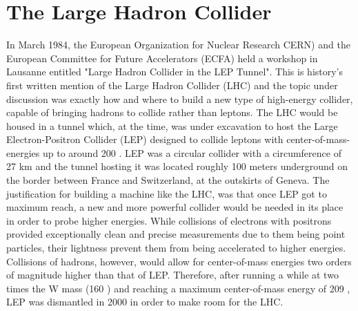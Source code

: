 \section{The Large Hadron Collider}
In March 1984, the European Organization for Nuclear Research CERN) and the European Committee for Future Accelerators (ECFA) 
held a workshop in Lausanne entitled "Large Hadron Collider in the LEP Tunnel". 
This is history's first written mention of the Large Hadron Collider (LHC) and the topic under discussion 
was exactly how and where to build a new type of high-energy collider, capable of bringing hadrons
to collide rather than leptons.
The LHC would be housed in a tunnel which, at the time, was under excavation to host the Large Electron-Positron Collider (LEP) designed to collide leptons with center-of-mass-energies up to around 200 \GeV.
LEP was a circular collider with a circumference of 27 km and the tunnel hosting it was located roughly 100 meters underground on the border between France and Switzerland, at the outskirts of Geneva. 
The justification for building a machine like the LHC, was that once LEP got to maximum reach, a new and more powerful collider would be needed in its place in order to probe higher energies.
While collisions of electrons with positrons provided exceptionally clean and precise measurements due to them being point particles,
 their lightness prevent them from being accelerated to higher energies. Collisions of hadrons, however, would allow for center-of-mass energies two orders of magnitude higher than that of LEP. Therefore, after running a while at two times the W mass (160 \GeV) and reaching a maximum center-of-mass energy of 209 \GeV, LEP was dismantled in 2000 in order to make room for the LHC.
 
